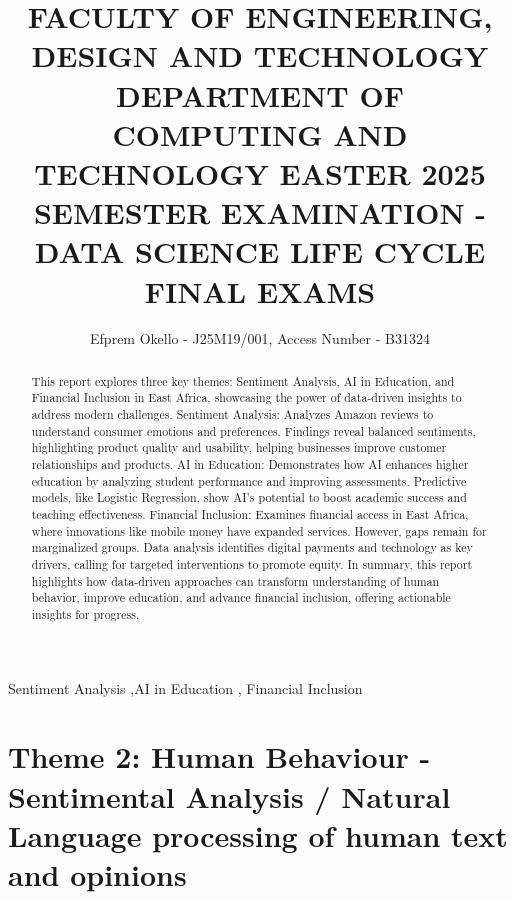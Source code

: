 \documentclass[preprint, 3p,
authoryear]{elsarticle} %
\begin{document}
\begin{frontmatter}

  \title{FACULTY OF ENGINEERING, DESIGN AND TECHNOLOGY DEPARTMENT OF
COMPUTING AND TECHNOLOGY EASTER 2025 SEMESTER EXAMINATION - DATA SCIENCE
LIFE CYCLE FINAL EXAMS}
    \author[Uganda Christian University]{Efprem Okello - J25M19/001,
Access Number - B31324%
  }
  
  \begin{abstract}
  This report explores three key themes: Sentiment Analysis, AI in
  Education, and Financial Inclusion in East Africa, showcasing the
  power of data-driven insights to address modern challenges. Sentiment
  Analysis: Analyzes Amazon reviews to understand consumer emotions and
  preferences. Findings reveal balanced sentiments, highlighting product
  quality and usability, helping businesses improve customer
  relationships and products. AI in Education: Demonstrates how AI
  enhances higher education by analyzing student performance and
  improving assessments. Predictive models, like Logistic Regression,
  show AI's potential to boost academic success and teaching
  effectiveness. Financial Inclusion: Examines financial access in East
  Africa, where innovations like mobile money have expanded services.
  However, gaps remain for marginalized groups. Data analysis identifies
  digital payments and technology as key drivers, calling for targeted
  interventions to promote equity. In summary, this report highlights
  how data-driven approaches can transform understanding of human
  behavior, improve education, and advance financial inclusion, offering
  actionable insights for progress.
  \end{abstract}
    \begin{keyword}
    Sentiment Analysis \sep AI in Education \sep 
    Financial Inclusion
  \end{keyword}
  
 \end{frontmatter}

\section{Theme 2: Human Behaviour - Sentimental Analysis / Natural
Language processing of human text and
opinions}\label{theme-2-human-behaviour---sentimental-analysis-natural-language-processing-of-human-text-and-opinions}
\end{document}
